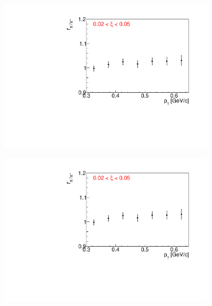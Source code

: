 \begin{figure}[h!]
\begin{subfigure}{.32\textwidth}
	\end{subfigure}
	\begin{subfigure}{.32\textwidth}
		\includegraphics[width=\linewidth, page=5]{chapters/chrgSTAR/img/dEdx/fit2019_fitResult_1_0_step_0.pdf}
	\end{subfigure}
	\begin{subfigure}{.32\textwidth}
		\includegraphics[width=\linewidth, page=6]{chapters/chrgSTAR/img/dEdx/fit2019_fitResult_1_0_step_0.pdf}
	\end{subfigure}
	\begin{subfigure}{.32\textwidth}

\end{subfigure}
\end{figure}
